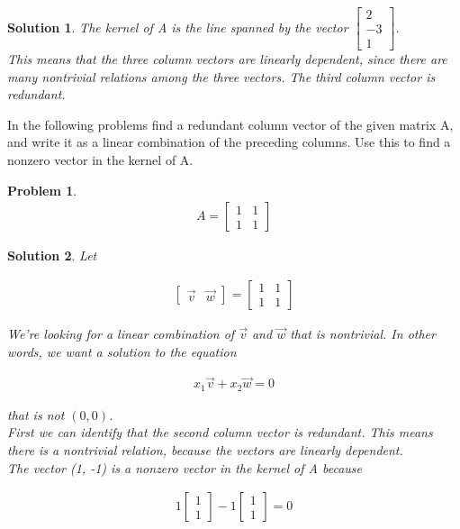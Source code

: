 \documentclass{article}
\newtheorem{problem}{Problem}
\newtheorem*{solution}{Solution}
\begin{document}
\begin{solution}
The kernel of A is the line spanned by the vector $\begin{bmatrix} 2 \\ -3 \\ 1 \end{bmatrix}$. \\

This means that the three column vectors are linearly dependent, since there are many nontrivial relations among the three vectors. The third column vector is redundant.

\end{solution}

In the following problems find a redundant column vector of the given matrix A, and write it as a linear combination of the preceding columns. Use this to find a nonzero vector in the kernel of A.

\begin{problem}
\begin{align*}
A = \begin{bmatrix}1 & 1 \\ 1 & 1 \end{bmatrix}
\end{align*}
\end{problem}

\begin{solution}
Let

\begin{align*}
\begin{bmatrix}\vec{v} & \vec{w} \end{bmatrix} = \begin{bmatrix}1 & 1 \\ 1 & 1 \end{bmatrix}
\end{align*}

We're looking for a linear combination of $\vec{v}$ and $\vec{w}$ that is nontrivial. In other words, we want a solution to the equation

\begin{align*}
x_{1} \vec{v} + x_{2} \vec{w} = 0
\end{align*}

that is not $(0, 0)$. \\

First we can identify that the second column vector is redundant. This means there is a nontrivial relation, because the vectors are linearly dependent. \\

The vector (1, -1) is a nonzero vector in the kernel of A because 

\begin{align*}
1\begin{bmatrix} 1 \\ 1 \end{bmatrix} - 1\begin{bmatrix} 1 \\ 1\end{bmatrix} = 0
\end{align*}

\end{solution}
\end{document}

